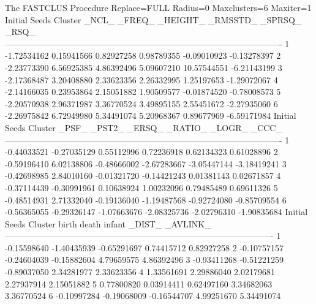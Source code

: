 \documentclass{article}
\begin{document}
\begin{Woutput}
The FASTCLUS Procedure
Replace=FULL  Radius=0  Maxclusters=6 Maxiter=1
                                          Initial Seeds
Cluster          _NCL_         _FREQ_       _HEIGHT_       _RMSSTD_        _SPRSQ_          _RSQ_
-------------------------------------------------------------------------------------------------
   1       -1.72534162     0.15941566     0.82927258     0.98789355    -0.09010923    -0.13278397
   2       -2.23773390     6.56925385     4.86392496     5.09607210    10.57544551    -6.21143199
   3       -2.17368487     3.20408880     2.33623356     2.26332995     1.25197653    -1.29072067
   4       -2.14166035     0.23953864     2.15051882     1.90509577    -0.01874520    -0.78008573
   5       -2.20570938     2.96371987     3.36770524     3.49895155     2.55451672    -2.27935060
   6       -2.26975842     6.72949980     5.34491074     5.20968367     0.89677969    -6.59171984
                                          Initial Seeds
Cluster          _PSF_         _PST2_         _ERSQ_        _RATIO_         _LOGR_          _CCC_
-------------------------------------------------------------------------------------------------
   1       -0.44033521    -0.27035129     0.55112996     0.72236918     0.62134323     0.61028896
   2       -0.59196410     6.02138806    -0.48666002    -2.67283667    -3.05447144    -3.18419241
   3       -0.42698985     2.84010160    -0.01321720    -0.14421243     0.01381143     0.02671857
   4       -0.37114439    -0.30991961     0.10638924     1.00232096     0.79485489     0.69611326
   5       -0.48514931     2.71332040    -0.19136040    -1.19487568    -0.92724080    -0.85709554
   6       -0.56365055    -0.29326147    -1.07663676    -2.08325736    -2.02796310    -1.90835684
                                        Initial Seeds
Cluster          birth             death            infant            _DIST_          _AVLINK_
----------------------------------------------------------------------------------------------
   1       -0.15598640       -1.40435939       -0.65291697        0.74415712        0.82927258
   2       -0.10757157       -0.24604039       -0.15882604        4.79659575        4.86392496
   3       -0.93411268       -0.51221259       -0.89037050        2.34281977        2.33623356
   4        1.33561691        2.29886040        2.02179681        2.27937914        2.15051882
   5        0.77800820        0.03914411        0.62497160        3.34682063        3.36770524
   6       -0.10997284       -0.19068009       -0.16544707        4.99251670        5.34491074


\end{Woutput}
\end{document}
